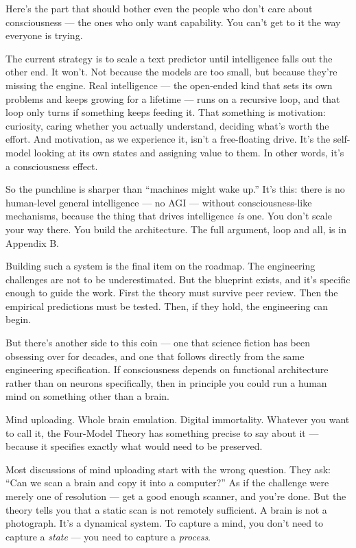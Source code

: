 \documentclass[11pt, twoside, openright]{book}
\begin{document}
Here's the part that should bother even the people who don't care about consciousness --- the ones who only want capability. You can't get to it the way everyone is trying.

The current strategy is to scale a text predictor until intelligence falls out the other end. It won't. Not because the models are too small, but because they're missing the engine. Real intelligence --- the open-ended kind that sets its own problems and keeps growing for a lifetime --- runs on a recursive loop, and that loop only turns if something keeps feeding it. That something is motivation: curiosity, caring whether you actually understand, deciding what's worth the effort. And motivation, as we experience it, isn't a free-floating drive. It's the self-model looking at its own states and assigning value to them. In other words, it's a consciousness effect.

So the punchline is sharper than ``machines might wake up.'' It's this: there is no human-level general intelligence --- no AGI --- without consciousness-like mechanisms, because the thing that drives intelligence \textit{is} one. You don't scale your way there. You build the architecture. The full argument, loop and all, is in Appendix B.

Building such a system is the final item on the roadmap. The engineering challenges are not to be underestimated. But the blueprint exists, and it's specific enough to guide the work. First the theory must survive peer review. Then the empirical predictions must be tested. Then, if they hold, the engineering can begin.


But there's another side to this coin --- one that science fiction has been obsessing over for decades, and one that follows directly from the same engineering specification. If consciousness depends on functional architecture rather than on neurons specifically, then in principle you could run a human mind on something other than a brain.

Mind uploading. Whole brain emulation. Digital immortality. Whatever you want to call it, the Four-Model Theory has something precise to say about it --- because it specifies exactly what would need to be preserved.

Most discussions of mind uploading start with the wrong question. They ask: ``Can we scan a brain and copy it into a computer?'' As if the challenge were merely one of resolution --- get a good enough scanner, and you're done. But the theory tells you that a static scan is not remotely sufficient. A brain is not a photograph. It's a dynamical system. To capture a mind, you don't need to capture a \textit{state} --- you need to capture a \textit{process}.
\end{document}
